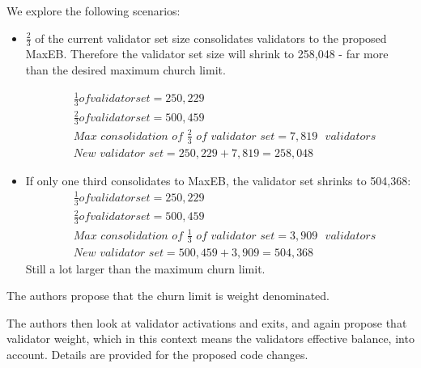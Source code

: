 \documentclass{article}
\begin{document}
\noindent
We explore the following scenarios:

\begin{itemize}
  \item $\frac{2}{3}$ of the current validator set size consolidates validators
    to the proposed MaxEB. Therefore the validator set size will shrink to
    258,048 - far more than the desired maximum church limit.

\begin{equation*}
  \begin{split}
& \frac{1}{3} of validator set = 250,229\\
& \frac{2}{3} of validator set = 500,459\\
& \textit{Max consolidation of } \frac{2}{3} \textit{ of validator set} = 7,819 \texttt{ } validators \\
& \textit{New validator set} = 250,229 + 7,819 = 258,048
  \end{split}
\end{equation*}

\item If only one third consolidates to MaxEB, the validator set shrinks to
  504,368:
  \begin{equation*}
    \begin{split}
& \frac{1}{3} of validator set = 250,229\\
& \frac{2}{3} of validator set = 500,459\\
& \textit{Max consolidation of } \frac{1}{3} \textit{ of validator set} = 3,909 \texttt{ } validators \\
& \textit{New validator set} = 500,459 + 3,909 = 504,368
    \end{split}
  \end{equation*}
  Still a lot larger than the maximum churn limit.

\end{itemize}
The authors propose that the churn limit is weight denominated. 

The authors then look at validator activations and exits, and again propose
that validator weight, which in this context means the validators effective
balance, into account. Details are provided for the proposed code changes.
\end{document}
